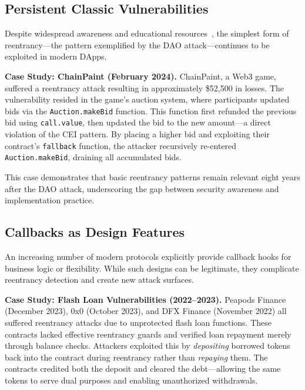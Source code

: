 

\subsection{Persistent Classic Vulnerabilities}
\label{sec:results-classic}
\label{case-study:1}

Despite widespread awareness and educational resources~\cite{solidity-security-considerations, checks-effects-interactions}, the simplest form of reentrancy---the pattern exemplified by the DAO attack---continues to be exploited in modern DApps.

\textbf{Case Study: ChainPaint (February 2024).} ChainPaint, a Web3 game, suffered a reentrancy attack resulting in approximately \$52,500 in losses. The vulnerability resided in the game's auction system, where participants updated bids via the \lstinline{Auction.makeBid} function. This function first refunded the previous bid using \lstinline{call.value}, then updated the bid to the new amount---a direct violation of the CEI pattern. By placing a higher bid and exploiting their contract's \lstinline{fallback} function, the attacker recursively re-entered \lstinline{Auction.makeBid}, draining all accumulated bids.

This case demonstrates that basic reentrancy patterns remain relevant eight years after the DAO attack, underscoring the gap between security awareness and implementation practice.

\subsection{Callbacks as Design Features}
\label{sec:results-callbacks}
\label{case-study:2}
\label{case-study:3}

An increasing number of modern protocols explicitly provide callback hooks for business logic or flexibility. While such designs can be legitimate, they complicate reentrancy detection and create new attack surfaces.

\textbf{Case Study: Flash Loan Vulnerabilities (2022--2023).} Peapods Finance (December 2023), 0x0 (October 2023), and DFX Finance (November 2022) all suffered reentrancy attacks due to unprotected flash loan functions. These contracts lacked effective reentrancy guards and verified loan repayment merely through balance checks. Attackers exploited this by \textit{depositing} borrowed tokens back into the contract during reentrancy rather than \textit{repaying} them. The contracts credited both the deposit and cleared the debt---allowing the same tokens to serve dual purposes and enabling unauthorized withdrawals.


